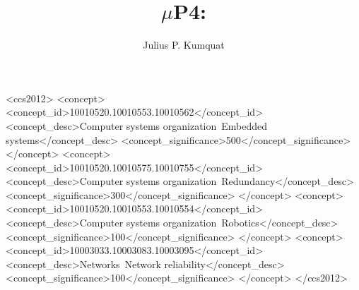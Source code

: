 \documentclass[10pt,sigconf,letterpaper,anonymous]{acmart}
\begin{document}
\title{$\mu$P4:}



\author{Julius P. Kumquat}

\renewcommand{\shortauthors}{Trovato and Tobin, et al.}

\begin{abstract}
 

 
 
\end{abstract}

\begin{CCSXML}
<ccs2012>
 <concept>
  <concept_id>10010520.10010553.10010562</concept_id>
  <concept_desc>Computer systems organization~Embedded systems</concept_desc>
  <concept_significance>500</concept_significance>
 </concept>
 <concept>
  <concept_id>10010520.10010575.10010755</concept_id>
  <concept_desc>Computer systems organization~Redundancy</concept_desc>
  <concept_significance>300</concept_significance>
 </concept>
 <concept>
  <concept_id>10010520.10010553.10010554</concept_id>
  <concept_desc>Computer systems organization~Robotics</concept_desc>
  <concept_significance>100</concept_significance>
 </concept>
 <concept>
  <concept_id>10003033.10003083.10003095</concept_id>
  <concept_desc>Networks~Network reliability</concept_desc>
  <concept_significance>100</concept_significance>
 </concept>
</ccs2012>
\end{CCSXML}

\end{document}
